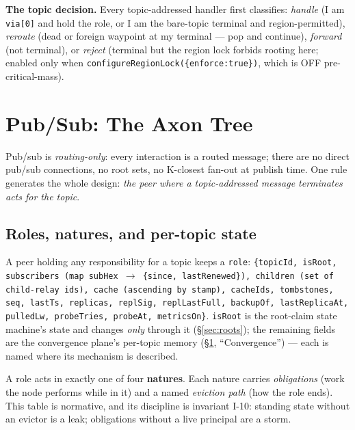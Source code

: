 \documentclass[nobib]{tufte-handout}
\begin{document}
\textbf{The topic decision.} Every topic-addressed handler first
classifies: \emph{handle} (I am \texttt{via[0]} and hold the role, or I
am the bare-topic terminal and region-permitted), \emph{reroute} (dead
or foreign waypoint at my terminal --- pop and continue),
\emph{forward} (not terminal), or \emph{reject} (terminal but the
region lock forbids rooting here; enabled only when
\texttt{configureRegionLock(\{enforce:true\})}, which is OFF
pre-critical-mass).

\section{Pub/Sub: The Axon Tree}\label{sec:pubsub}

Pub/sub is \emph{routing-only}: every interaction is a routed message;
there are no direct pub/sub connections, no root sets, no K-closest
fan-out at publish time. One rule generates the whole design: \emph{the
peer where a topic-addressed message terminates acts for the topic}.

\subsection{Roles, natures, and per-topic state}

A peer holding any responsibility for a topic keeps a \texttt{role}:
\texttt{\{topicId, isRoot, subscribers (map subHex $\to$ \{since,
lastRenewed\}), children (set of child-relay ids), cache (ascending by
stamp), cacheIds, tombstones, seq, lastTs, replicas, replSig,
replLastFull, backupOf, lastReplicaAt, pulledLw, probeTries, probeAt,
metricsOn\}}. \texttt{isRoot} is the root-claim state machine's state
and changes \emph{only} through it (\S\ref{sec:roots}); the remaining
fields are the convergence plane's per-topic memory
(\S\ref{sec:pubsub}, ``Convergence'') --- each is named where its
mechanism is described.

A role acts in exactly one of four \textbf{natures}. Each nature
carries \emph{obligations} (work the node performs while in it) and a
named \emph{eviction path} (how the role ends). This table is
normative, and its discipline is invariant I-10: standing state
without an evictor is a leak; obligations without a live principal are
a storm.
\end{document}
